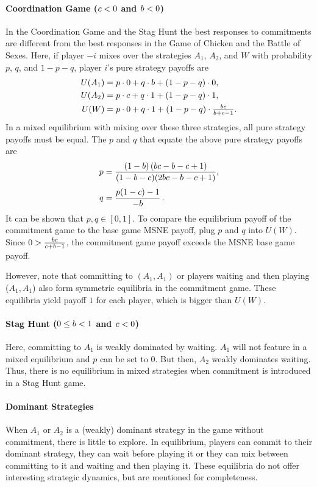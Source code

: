 \documentclass[main.tex]{subfiles}
\begin{document}
\paragraph{Coordination Game ($c<0$ and $b<0$)}
In the Coordination Game and the Stag Hunt the best responses to commitments are different from the best responses in the Game of Chicken and the Battle of Sexes. Here, if player $-i$ mixes over the strategies $A_1$, $A_2$, and $W$ with probability $p$, $q$, and $1-p-q$, player $i$'s pure strategy payoffs are
\begin{align*}
U(A_1) &= p\cdot 0 + q\cdot b + (1-p-q)\cdot 0,\\[0mm]
U(A_2) &= p\cdot c + q\cdot 1 + (1-p-q)\cdot 1,\\[0mm]
U(W) &= p\cdot 0 + q\cdot 1 + (1-p-q)\cdot \tfrac{bc}{b+c-1}.
\end{align*}
In a mixed equilibrium with mixing over these three strategies, all pure strategy payoffs must be equal. The $p$ and $q$ that equate the above pure strategy payoffs are
\begin{alignat*}{1}
p &= \frac{(1-b)\,(bc-b-c+1)}{(1-b-c)(2bc-b - c + 1)},\\[1mm]
q &= \frac{p(1-c)-1}{-b}\,.
\end{alignat*}
It can be shown that $p,q\in[0,1]$. To compare the equilibrium payoff of the commitment game to the base game MSNE payoff, plug $p$ and $q$ into $U(W)$. Since $0>\tfrac{bc}{c+b-1}$, the commitment game payoff exceeds the MSNE base game payoff.
 
However, note that committing to $(A_1,A_1)$ or players waiting and then playing ($A_1,A_1$) also form symmetric equilibria in the commitment game. These equilibria yield payoff $1$ for each player, which is bigger than $U(W)$.
\paragraph{Stag Hunt ($0\leq b<1$ and $c<0$)}
Here, committing to $A_1$ is weakly dominated by waiting. $A_1$ will not feature in a mixed equilibrium and $p$ can be set to $0$. But then, $A_2$ weakly dominates waiting. Thus, there is no equilibrium in mixed strategies when commitment is introduced in a Stag Hunt game.
\paragraph{Dominant Strategies}
When $A_1$ or $A_2$ is a (weakly) dominant strategy in the game without commitment, there is little to explore. In equilibrium, players can commit to their dominant strategy, they can wait before playing it or they can mix between committing to it and waiting and then playing it. These equilibria do not offer interesting strategic dynamics, but are mentioned for completeness.
\end{document}
